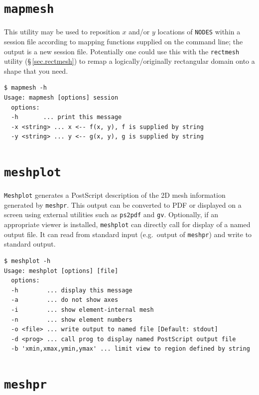 \documentclass[11pt]{report}
\newcommand{\eg}{e.g.\ } \newcommand{\CC}{\mathrm{c.c.}}
\begin{document}
\section{\texttt{mapmesh}}
\label{sec.mapmesh}

This utility may be used to reposition $x$ and/or $y$ locations of
\verb|NODES| within a session file according to mapping functions
supplied on the command line; the output is a new session file.
Potentially one could use this with the \verb|rectmesh| utility
(\S\,\ref{sec.rectmesh}) to remap a logically/originally rectangular
domain onto a shape that you need.
%
{\small
\begin{verbatim}
$ mapmesh -h
Usage: mapmesh [options] session
  options:
  -h       ... print this message
  -x <string> ... x <-- f(x, y), f is supplied by string
  -y <string> ... y <-- g(x, y), g is supplied by string
\end{verbatim}
}
%

\section{\texttt{meshplot}}
\label{sec.meshpr}

\verb|Meshplot| generates a PostScript description of the 2D mesh
information generated by \verb|meshpr|.  This output can be converted
to PDF or displayed on a screen using external utilities such as
\verb|ps2pdf| and \verb|gv|.  Optionally, if an appropriate viewer is
installed, \verb|meshplot| can directly call for display of a named
output file.  It can read from standard input (\eg output of
\verb|meshpr|) and write to standard output.
%
{\small
\begin{verbatim}
$ meshplot -h
Usage: meshplot [options] [file]
  options:
  -h        ... display this message
  -a        ... do not show axes
  -i        ... show element-internal mesh
  -n        ... show element numbers
  -o <file> ... write output to named file [Default: stdout]
  -d <prog> ... call prog to display named PostScript output file
  -b 'xmin,xmax,ymin,ymax' ... limit view to region defined by string
\end{verbatim}
}

\section{\texttt{meshpr}}
\label{sec.meshpr}
\end{document}
